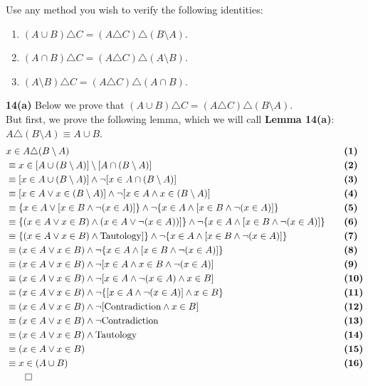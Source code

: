 Use any method you wish to verify the following identities:

\begin{enumerate}[label=(\alph*)]
\item $(A \cup B) \triangle C = (A \triangle C) \triangle (B \setminus A)$.
\item $(A \cap B) \triangle C = (A \triangle C) \triangle (A \setminus B)$.
\item $(A \setminus B) \triangle C = (A \triangle C) \triangle (A \cap B)$.
\end{enumerate}

\textbf{14(a)} Below we prove that $(A \cup B) \triangle C = (A \triangle C) \triangle (B \setminus A)$.\\
But first, we prove the following lemma, which we will call \textbf{Lemma 14(a)}: $A \triangle (B \setminus A) \equiv A \cup B$.
\begin{alignat*}{2}
&x \in A \triangle (B \setminus A)  && \quad \textbf{(1)} \\
&\equiv x \in [A \cup (B \setminus A)] \setminus [A \cap (B \setminus A)] && \quad \textbf{(2)}\\
&\equiv [x \in A \cup (B \setminus A)] \wedge \neg [x \in A \cap (B \setminus A)] && \quad \textbf{(3)}\\
&\equiv [x \in A \vee x \in (B \setminus A)] \wedge \neg [x \in A \wedge x \in (B \setminus A)] && \quad \textbf{(4)}\\
&\equiv \{x \in A \vee [x \in B \wedge \neg (x \in A)]\} \wedge \neg \{x \in A \wedge [x \in B \wedge \neg (x \in A)]\} && \quad \textbf{(5)}\\
&\equiv \{(x \in A \vee x \in B) \wedge (x \in A \vee \neg (x \in A))]\} \wedge \neg \{x \in A \wedge [x \in B \wedge \neg (x \in A)]\} && \quad \textbf{(6)}\\
&\equiv \{(x \in A \vee x \in B) \wedge \text{Tautology}]\} \wedge \neg \{x \in A \wedge [x \in B \wedge \neg (x \in A)]\} && \quad \textbf{(7)}\\
&\equiv (x \in A \vee x \in B) \wedge \neg \{x \in A \wedge [x \in B \wedge \neg (x \in A)]\} && \quad \textbf{(8)}\\
&\equiv (x \in A \vee x \in B) \wedge \neg [x \in A \wedge x \in B \wedge \neg (x \in A)] && \quad \textbf{(9)}\\
&\equiv (x \in A \vee x \in B) \wedge \neg [x \in A \wedge \neg (x \in A) \wedge x \in B] && \quad \textbf{(10)}\\
&\equiv (x \in A \vee x \in B) \wedge \neg \{[x \in A \wedge \neg (x \in A)] \wedge x \in B\} && \quad \textbf{(11)}\\
&\equiv (x \in A \vee x \in B) \wedge \neg [\text{Contradiction} \wedge x \in B] && \quad \textbf{(12)}\\
&\equiv (x \in A \vee x \in B) \wedge \neg \text{Contradiction} && \quad \textbf{(13)}\\
&\equiv (x \in A \vee x \in B) \wedge \text{Tautology} && \quad \textbf{(14)}\\
&\equiv (x \in A \vee x \in B) && \quad \textbf{(15)}\\
&\equiv x \in (A \cup B) && \quad \textbf{(16)}\\
&\qed
\end{alignat*}

